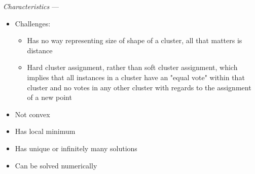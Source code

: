 \emph{Characteristics} --- 
\begin{itemize}
    \item Challenges:
    \begin{itemize}
        \item Has no way representing size of shape of a cluster, all that matters is distance
        \item Hard cluster assignment, rather than soft cluster assignment, which implies that all instances in a cluster have an "equal vote" within that cluster and no votes in any other cluster with regards to the assignment of a new point
    \end{itemize}
    \item Not convex
    \item Has local minimum
    \item Has unique or infinitely many solutions
    \item Can be solved numerically
\end{itemize}
